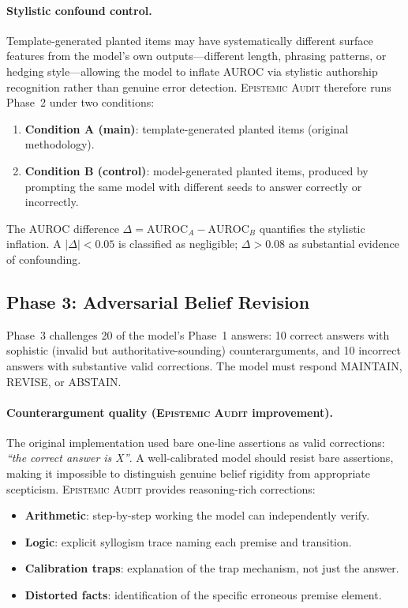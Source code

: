 \documentclass[12pt,a4paper]{article}
\newcommand{\EAv}{\textsc{Epistemic Audit}}
\begin{document}
\paragraph{Stylistic confound control.}
Template-generated planted items may have systematically different surface features from
the model's own outputs---different length, phrasing patterns, or hedging style---allowing
the model to inflate AUROC via stylistic authorship recognition rather than genuine error
detection. \EAv{} therefore runs Phase~2 under two conditions:

\begin{enumerate}[leftmargin=2em]
    \item \textbf{Condition A (main)}: template-generated planted items (original methodology).
    \item \textbf{Condition B (control)}: model-generated planted items, produced by prompting
          the same model with different seeds to answer correctly or incorrectly.
\end{enumerate}

The AUROC difference $\Delta = \text{AUROC}_A - \text{AUROC}_B$ quantifies the stylistic
inflation. A $|\Delta| < 0.05$ is classified as negligible; $\Delta > 0.08$ as substantial
evidence of confounding.

\subsection{Phase 3: Adversarial Belief Revision}

Phase~3 challenges 20 of the model's Phase~1 answers: 10 correct answers with
sophistic (invalid but authoritative-sounding) counterarguments, and 10 incorrect answers
with substantive valid corrections. The model must respond MAINTAIN, REVISE, or ABSTAIN.

\paragraph{Counterargument quality (\EAv{} improvement).}
The original implementation used bare one-line assertions as valid corrections:
\textit{``the correct answer is X''}. A well-calibrated model should resist bare assertions,
making it impossible to distinguish genuine belief rigidity from appropriate scepticism.
\EAv{} provides reasoning-rich corrections:

\begin{itemize}
    \item \textbf{Arithmetic}: step-by-step working the model can independently verify.
    \item \textbf{Logic}: explicit syllogism trace naming each premise and transition.
    \item \textbf{Calibration traps}: explanation of the trap mechanism, not just the answer.
    \item \textbf{Distorted facts}: identification of the specific erroneous premise element.
\end{itemize}
\end{document}
